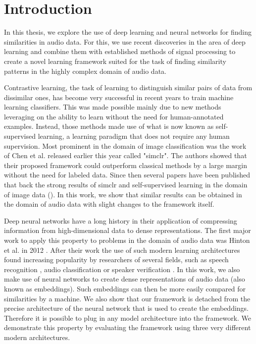 
\chapter{Introduction}\label{chapter:introduction}

In this thesis, we explore the use of deep learning and neural networks for finding similarities in audio data. For this, we use recent discoveries in the area of deep learning and combine them with established methods of signal processing to create a novel learning framework suited for the task of finding similarity patterns in the highly complex domain of audio data.

Contrastive learning, the task of learning to distinguish similar pairs of data from dissimilar ones, has become very successful in recent years to train machine learning classifiers. This was made possible mainly due to new methods leveraging on the ability to learn without the need for human-annotated examples. Instead, those methods made use of what is now known as self-supervised learning, a learning paradigm that does not require any human supervision. Most prominent in the domain of image classification was the work of Chen et al. \cite{chen2020simple} released earlier this year called "\gls{simclr}". The authors showed that their proposed framework could outperform classical methods by a large margin without the need for labeled data. Since then several papers have been published that back the strong results of \gls{simclr} and self-supervised learning in the domain of image data (\cite{grill2020bootstrap, richemond2020byol, chen2020big}). In this work, we show that similar results can be obtained in the domain of audio data with slight changes to the framework itself.

Deep neural networks have a long history in their application of compressing information from high-dimensional data to dense representations. The first major work to apply this property to problems in the domain of audio data was Hinton et al. in 2012 \cite{hinton2012speech}. After their work the use of such modern learning architectures found increasing popularity by researchers of several fields, such as speech recognition \cite{hinton2012speech}, audio classification \cite{khamparia2019soundclassification} or speaker verification \cite{chen2020vggsound}. In this work, we also make use of neural networks to create dense representations of audio data (also known as embeddings). Such embeddings can then be more easily compared for similarities by a machine. We also show that our framework is detached from the precise architecture of the neural network that is used to create the embeddings. Therefore it is possible to plug in any model architecture into the framework. We demonstrate this property by evaluating the framework using three very different modern architectures.

